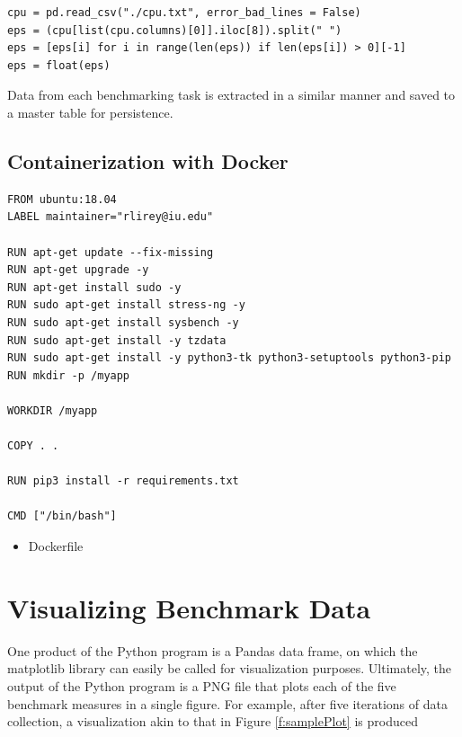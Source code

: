 \documentclass[sigconf]{acmart}
\begin{document}
\begin{lstlisting}
cpu = pd.read_csv("./cpu.txt", error_bad_lines = False)
eps = (cpu[list(cpu.columns)[0]].iloc[8]).split(" ")
eps = [eps[i] for i in range(len(eps)) if len(eps[i]) > 0][-1]
eps = float(eps)
\end{lstlisting}

Data from each benchmarking task is extracted in a similar manner and saved to a master table for persistence.

\subsection{Containerization with Docker}

\begin{lstlisting}
FROM ubuntu:18.04
LABEL maintainer="rlirey@iu.edu"

RUN apt-get update --fix-missing
RUN apt-get upgrade -y
RUN apt-get install sudo -y
RUN sudo apt-get install stress-ng -y
RUN sudo apt-get install sysbench -y
RUN sudo apt-get install -y tzdata
RUN sudo apt-get install -y python3-tk python3-setuptools python3-pip
RUN mkdir -p /myapp

WORKDIR /myapp

COPY . .

RUN pip3 install -r requirements.txt

CMD ["/bin/bash"]
\end{lstlisting}

\begin{itemize}
  \item Dockerfile
\end{itemize}

\section{Visualizing Benchmark Data}

One product of the Python program is a Pandas data frame, on which the matplotlib library can easily be called for visualization purposes. Ultimately, the output of the Python program is a PNG file that plots each of the five benchmark measures in a single figure. For example, after five iterations of data collection, a visualization akin to that in Figure \ref{f:samplePlot} is produced
\end{document}
